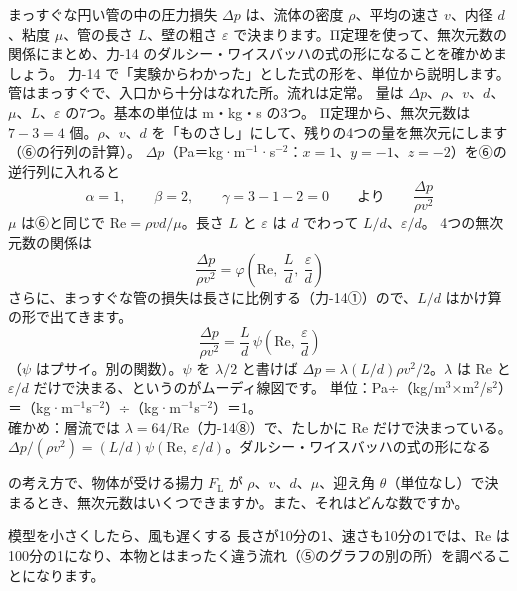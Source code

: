 \begin{phreidai}\label{ph:力-15:ex13}
まっすぐな円い管の中の圧力損失 $\Delta p$ は、流体の密度 $\rho$、平均の速さ $v$、内径 $d$、粘度 $\mu$、管の長さ $L$、壁の粗さ $\varepsilon$ で決まります。Π定理を使って、無次元数の関係にまとめ、力-14 のダルシー・ワイスバッハの式の形になることを確かめましょう。
\phbamen
力-14 で「実験からわかった」とした式の形を、単位から説明します。
\phmushi
管はまっすぐで、入口から十分はなれた所。流れは定常。
\phzu
量は $\Delta p$、$\rho$、$v$、$d$、$\mu$、$L$、$\varepsilon$ の7つ。基本の単位は m・kg・s の3つ。
\phriyu
Π定理から、無次元数は $7-3=4$ 個。$\rho$、$v$、$d$ を「ものさし」にして、残りの4つの量を無次元にします（⑥の行列の計算）。
\phtateru
$\Delta p$（Pa＝kg·m$^{-1}$·s$^{-2}$：$x=1$、$y=-1$、$z=-2$）を⑥の逆行列に入れると
\[\alpha =1,\qquad \beta =2,\qquad \gamma =3-1-2=0\qquad\text{より}\qquad\frac{\Delta p}{\rho v^2}\]
$\mu$ は⑥と同じで $\mathrm{Re}=\rho vd/\mu$。長さ $L$ と $\varepsilon$ は $d$ でわって $L/d$、$\varepsilon/d$。
\phtoku
4つの無次元数の関係は
\[\frac{\Delta p}{\rho v^2}=\varphi\left(\mathrm{Re},\ \frac{L}{d},\ \frac{\varepsilon}{d}\right)\]
さらに、まっすぐな管の損失は長さに比例する（力-14①）ので、$L/d$ はかけ算の形で出てきます。
\[\frac{\Delta p}{\rho v^2}=\frac{L}{d}\,\psi\left(\mathrm{Re},\ \frac{\varepsilon}{d}\right)\]
（$\psi$ はプサイ。別の関数）。$\psi$ を $\lambda/2$ と書けば $\Delta p=\lambda (L/d)\rho v^2/2$。$\lambda$ は Re と $\varepsilon/d$ だけで決まる、というのがムーディ線図です。
\phtashikame
単位：Pa÷（kg/m$^3$×m$^2$/s$^2$）＝（kg·m$^{-1}$s$^{-2}$）÷（kg·m$^{-1}$s$^{-2}$）＝1。\\
確かめ：層流では $\lambda=64/\mathrm{Re}$（力-14⑧）で、たしかに Re だけで決まっている。
\kotae $\Delta p/(\rho v^2)=(L/d)\psi(\mathrm{Re},\ \varepsilon/d)$。ダルシー・ワイスバッハの式の形になる
\end{phreidai}
\begin{jibun}
の考え方で、物体が受ける揚力 $F_{\mathrm L}$ が $\rho$、$v$、$d$、$\mu$、迎え角 $\theta$（単位なし）で決まるとき、無次元数はいくつできますか。また、それはどんな数ですか。
\end{jibun}


\begin{tsumazuki}{模型を小さくしたら、風も遅くする}
長さが10分の1、速さも10分の1では、Re は100分の1になり、本物とはまったく違う流れ（⑤のグラフの別の所）を調べることになります。
\end{tsumazuki}

